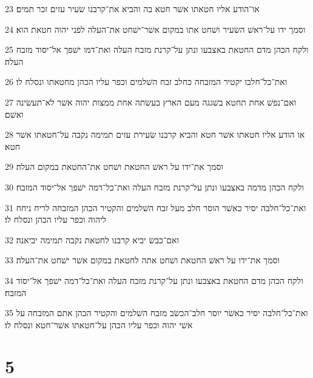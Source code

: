 \par 23 או־הודע אליו חטאתו אשׁר חטא בה והביא את־קרבנו שׂעיר עזים זכר תמים׃
\par 24 וסמך ידו על־ראשׁ השׂעיר ושׁחט אתו במקום אשׁר־ישׁחט את־העלה לפני יהוה חטאת הוא׃
\par 25 ולקח הכהן מדם החטאת באצבעו ונתן על־קרנת מזבח העלה ואת־דמו ישׁפך אל־יסוד מזבח העלה׃
\par 26 ואת־כל־חלבו יקטיר המזבחה כחלב זבח השׁלמים וכפר עליו הכהן מחטאתו ונסלח לו׃
\par 27 ואם־נפשׁ אחת תחטא בשׁגגה מעם הארץ בעשׂתה אחת ממצות יהוה אשׁר לא־תעשׂינה ואשׁם׃
\par 28 או הודע אליו חטאתו אשׁר חטא והביא קרבנו שׂעירת עזים תמימה נקבה על־חטאתו אשׁר חטא׃
\par 29 וסמך את־ידו על ראשׁ החטאת ושׁחט את־החטאת במקום העלה׃
\par 30 ולקח הכהן מדמה באצבעו ונתן על־קרנת מזבח העלה ואת־כל־דמה ישׁפך אל־יסוד המזבח׃
\par 31 ואת־כל־חלבה יסיר כאשׁר הוסר חלב מעל זבח השׁלמים והקטיר הכהן המזבחה לריח ניחח ליהוה וכפר עליו הכהן ונסלח לו׃
\par 32 ואם־כבשׂ יביא קרבנו לחטאת נקבה תמימה יביאנה׃
\par 33 וסמך את־ידו על ראשׁ החטאת ושׁחט אתה לחטאת במקום אשׁר ישׁחט את־העלה׃
\par 34 ולקח הכהן מדם החטאת באצבעו ונתן על־קרנת מזבח העלה ואת־כל־דמה ישׁפך אל־יסוד המזבח׃
\par 35 ואת־כל־חלבה יסיר כאשׁר יוסר חלב־הכשׂב מזבח השׁלמים והקטיר הכהן אתם המזבחה על אשׁי יהוה וכפר עליו הכהן על־חטאתו אשׁר־חטא ונסלח לו׃

\chapter{5}

